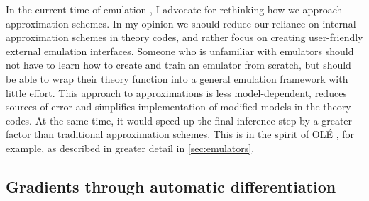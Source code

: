 \documentclass[USenglish, thumbmarks]{uiophdthesis} %
\begin{document}
In the current time of emulation \cite{nygaardPosteriorSamplingAge2026}, I advocate for rethinking how we approach approximation schemes.
In my opinion we should reduce our reliance on internal approximation schemes in theory codes,
and rather focus on creating user-friendly external emulation interfaces.
Someone who is unfamiliar with emulators should not have to learn how to create and train an emulator from scratch,
but should be able to wrap their theory function into a general emulation framework with little effort.
This approach to approximations is less model-dependent,
reduces sources of error and simplifies implementation of modified models in the theory codes.
At the same time, it would speed up the final inference step by a greater factor than traditional approximation schemes.
This is in the spirit of OLÉ \cite{guntherUncertaintyawareDataefficientCosmological2024,guntherOLEOnlineLearning2025}, for example,
as described in greater detail in \cref{sec:emulators}.

\subsection{Gradients through automatic differentiation}
\end{document}
